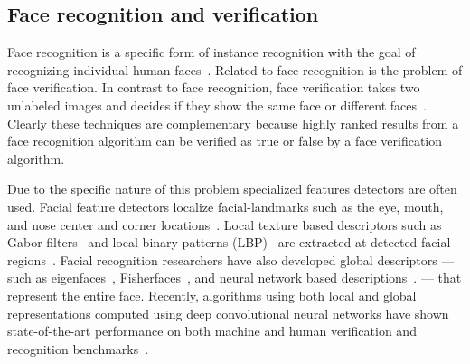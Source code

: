 

    \subsection{Face recognition and verification}
        Face recognition is a specific form of instance recognition with the goal of recognizing individual human
        faces~\cite{zhao_face_2003, huang_labeled_2007}. Related to face recognition is the problem of face
        verification. In contrast to face recognition, face verification takes two unlabeled images and decides if
        they show the same face or different faces~\cite{taigman_deepface_2014}. Clearly these techniques are
        complementary because highly ranked results from a face recognition algorithm can be verified as true or
        false by a face verification algorithm.

        Due to the specific nature of this problem specialized features detectors are often used. Facial feature
        detectors localize facial-landmarks such as the eye, mouth, and nose center and corner
        locations~\cite{dantone_real_time_2012, berg_tom_vs_pete_2012}. Local texture based descriptors such as Gabor
        filters~\cite{liu_gabor_2002, zhang_histogram_2007, shen_review_2006} and local binary patterns
        (LBP)~\cite{ahonen_face_2006, chen_blessing_2013} are extracted at detected facial
        regions~\cite{belhumeur_localizing_2011}. Facial recognition researchers have also developed global
        descriptors --- such as eigenfaces~\cite{turk_eigenfaces_1991},
        Fisherfaces~\cite{belhumeur_eigenfaces_1997}, and neural network based
        descriptions~\cite{lawrence_face_1997, taigman_deepface_2014}. --- that represent the entire face.
        Recently, algorithms using both local and global representations computed using deep convolutional neural
        networks have shown state-of-the-art performance on both machine and human verification and recognition
        benchmarks~\cite{taigman_deepface_2014}.
        
